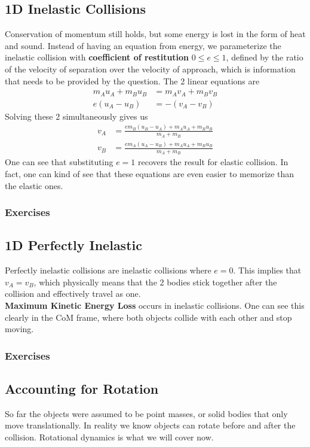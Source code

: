 \documentclass{article}
\begin{document}
\subsection{1D Inelastic Collisions}
Conservation of momentum still holds, but some energy is lost in the form of heat and sound. Instead of having an equation from energy, we parameterize the inelastic collision with \textbf{coefficient of restitution} $0\leq e \leq 1$, defined by the ratio of the velocity of separation over the velocity of approach, which is information that needs to be provided by the question. The 2 linear equations are 
\begin{align}
    m_A u_A + m_B u_B &= m_A v_A + m_B v_B \\
    e (u_A - u_B) &= -(v_A - v_B)
\end{align}
Solving these 2 simultaneously gives us
\begin{align}
    v_A &= \frac{e m_B (u_B - u_A) + m_A u_A + m_B u_B}{m_A + m_B} \\
    v_B &= \frac{e m_A (u_A - u_B) + m_A u_A + m_B u_B}{m_A + m_B}
\end{align}
One can see that substituting $e=1$ recovers the result for elastic collision. In fact, one can kind of see that these equations are even easier to memorize than the elastic ones. 
\subsubsection{Exercises}
\subsection{1D Perfectly Inelastic}
Perfectly inelastic collisions are inelastic collisions where $e=0$. This implies that $v_A = v_B$, which physically means that the 2 bodies stick together after the collision and effectively travel as one. \\[10pt]
\textbf{Maximum Kinetic Energy Loss} occurs in inelastic collisions. One can see this clearly in the CoM frame, where both objects collide with each other and stop moving. 
\subsubsection{Exercises}
\subsection{Accounting for Rotation}
So far the objects were assumed to be point masses, or solid bodies that only move translationally. In reality we know objects can rotate before and after the collision. Rotational dynamics is what we will cover now.
\end{document}
